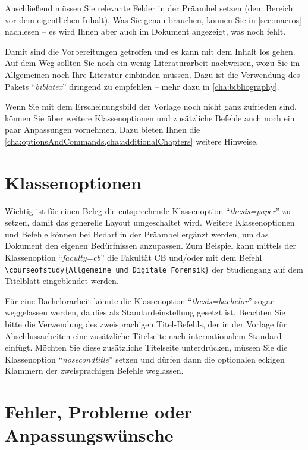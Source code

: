 	Anschließend müssen Sie relevante Felder in der Präambel setzen (dem Bereich vor dem eigentlichen Inhalt).
	Was Sie genau brauchen, können Sie in \cref{sec:macros} nachlesen -- es wird Ihnen aber auch im Dokument angezeigt, was noch fehlt.
	
	Damit sind die Vorbereitungen getroffen und es kann mit dem Inhalt los gehen.
	Auf dem Weg sollten Sie noch ein wenig Literaturarbeit nachweisen, wozu Sie im Allgemeinen noch Ihre Literatur einbinden müssen.
	Dazu ist die Verwendung des Pakets \enquote{\textit{biblatex}} dringend zu empfehlen -- mehr dazu in \cref{cha:bibliography}.
	
	Wenn Sie mit dem Erscheinungsbild der Vorlage noch nicht ganz zufrieden sind, können Sie über weitere Klassenoptionen und zusätzliche Befehle auch noch ein paar Anpassungen vornehmen.
	Dazu bieten Ihnen die \cref{cha:optionsAndCommands,cha:additionalChapters} weitere Hinweise.
	
	\section{Klassenoptionen}
	
	
	Wichtig ist für einen Beleg die entsprechende Klassenoption \enquote{\textit{thesis=paper}} zu setzen, damit das generelle Layout umgeschaltet wird.
	Weitere Klassenoptionen und Befehle können bei Bedarf in der Präambel ergänzt werden, um das Dokument den eigenen Bedürfnissen anzupassen.
	Zum Beispiel kann mittels der Klassenoption \enquote{\textit{faculty=cb}} die Fakultät CB und/oder mit dem Befehl \verb|\courseofstudy{Allgemeine und Digitale Forensik}| der Studiengang auf dem Titelblatt eingeblendet werden.
	
	
	Für eine Bachelorarbeit könnte die Klassenoption \enquote{\textit{thesis=bachelor}} sogar weggelassen werden, da dies als Standardeinstellung gesetzt ist.
	Beachten Sie bitte die Verwendung des zweisprachigen Titel-Befehls, der in der Vorlage für Abschlussarbeiten eine zusätzliche Titelseite nach internationalem Standard einfügt.
	Möchten Sie diese zusätzliche Titelseite unterdrücken, müssen Sie die Klassenoption \enquote{\textit{nosecondtitle}} setzen und dürfen dann die optionalen eckigen Klammern der zweisprachigen Befehle weglassen.
	
	\section{Fehler, Probleme oder Anpassungswünsche}
	
